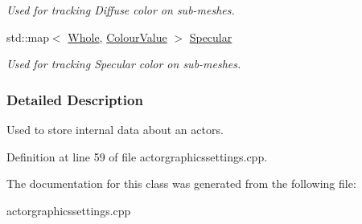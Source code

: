 \begin{DoxyCompactItemize}
\begin{DoxyCompactList}\small\item\em Used for tracking Diffuse color on sub-\/meshes. \item\end{DoxyCompactList}\item 
\hypertarget{classphys_1_1internal_1_1InternalActorGraphicsSettings_affba686bba9be08fee3af07ccee4711a}{
std::map$<$ \hyperlink{namespacephys_a460f6bc24c8dd347b05e0366ae34f34a}{Whole}, \hyperlink{classphys_1_1ColourValue}{ColourValue} $>$ \hyperlink{classphys_1_1internal_1_1InternalActorGraphicsSettings_affba686bba9be08fee3af07ccee4711a}{Specular}}
\label{classphys_1_1internal_1_1InternalActorGraphicsSettings_affba686bba9be08fee3af07ccee4711a}

\begin{DoxyCompactList}\small\item\em Used for tracking Specular color on sub-\/meshes. \item\end{DoxyCompactList}\end{DoxyCompactItemize}


\subsubsection{Detailed Description}
Used to store internal data about an actors. 

Definition at line 59 of file actorgraphicssettings.cpp.



The documentation for this class was generated from the following file:\begin{DoxyCompactItemize}
\item 
actorgraphicssettings.cpp\end{DoxyCompactItemize}
